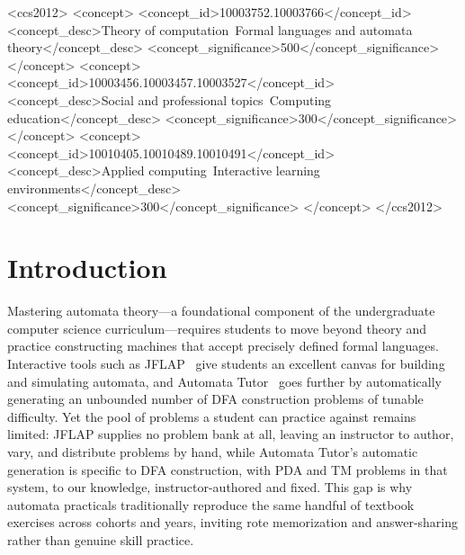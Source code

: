 \documentclass[sigconf]{acmart}
\begin{document}
\begin{CCSXML}
<ccs2012>
   <concept>
       <concept_id>10003752.10003766</concept_id>
       <concept_desc>Theory of computation~Formal languages and automata theory</concept_desc>
       <concept_significance>500</concept_significance>
   </concept>
   <concept>
      <concept_id>10003456.10003457.10003527</concept_id>
      <concept_desc>Social and professional topics~Computing education</concept_desc>
      <concept_significance>300</concept_significance>
  </concept>
  <concept>
    <concept_id>10010405.10010489.10010491</concept_id>
  <concept_desc>Applied computing~Interactive learning environments</concept_desc>
   <concept_significance>300</concept_significance>
</concept>
</ccs2012>
\end{CCSXML}



\maketitle

\section{Introduction}
Mastering automata theory---a foundational component of the undergraduate computer science curriculum---requires 
students to move beyond theory and practice constructing machines that accept precisely defined formal languages. 
Interactive tools such as JFLAP~\cite{rodger2006jflap} give students an excellent canvas for building and 
simulating automata, and Automata Tutor~\cite{alur2013automated,dantoni2020automata} goes further by automatically 
generating an unbounded number of DFA construction problems of tunable difficulty. 
Yet the pool of problems a student can practice against remains limited: JFLAP supplies no problem bank at all, 
leaving an instructor to author, vary, and distribute problems by hand, 
while Automata Tutor's automatic generation is specific to DFA construction, 
with PDA and TM problems in that system, to our knowledge, instructor-authored and fixed. 
This gap is why automata practicals traditionally reproduce the same handful of textbook exercises across 
cohorts and years, inviting rote memorization and answer-sharing rather than genuine skill practice.
\end{document}
